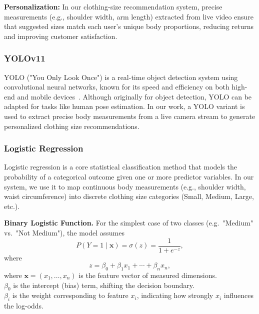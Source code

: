 \documentclass{llncs}
\begin{document}
\medskip

\textbf{Personalization:} In our clothing-size recommendation system, precise measurements (e.g., shoulder width, arm length) extracted from live video ensure that suggested sizes match each user's unique body proportions, reducing returns and improving customer satisfaction.


\subsubsection{YOLOv11}
YOLO ("You Only Look Once") is a real-time object detection system using convolutional neural networks, known for its speed and efficiency on both high-end and mobile devices~\cite{ref5}. Although originally for object detection, YOLO can be adapted for tasks like human pose estimation. In our work, a YOLO variant is used to extract precise body measurements from a live camera stream to generate personalized clothing size recommendations.

\subsubsection{Logistic Regression}
Logistic regression is a core statistical classification method that models the probability of a categorical outcome given one or more predictor variables. In our system, we use it to map continuous body measurements (e.g., shoulder width, waist circumference) into discrete clothing size categories (Small, Medium, Large, etc.).

\textbf{Binary Logistic Function.} For the simplest case of two classes (e.g.\ "Medium" vs.\ "Not Medium"), the model assumes
\begin{equation}
P(Y = 1 \mid \mathbf{x}) = \sigma(z) = \frac{1}{1 + e^{-z}},
\end{equation}
where
\begin{equation}
z = \beta_{0} + \beta_{1} x_{1} + \cdots + \beta_{n} x_{n},
\end{equation}
where
$\mathbf{x} = (x_{1},\ldots,x_{n})$ is the feature vector of measured dimensions. \\

$\beta_{0}$ is the intercept (bias) term, shifting the decision boundary. \\

$\beta_{i}$ is the weight corresponding to feature $x_{i}$, indicating how strongly $x_i$ influences the log-odds. \\
\end{document}
